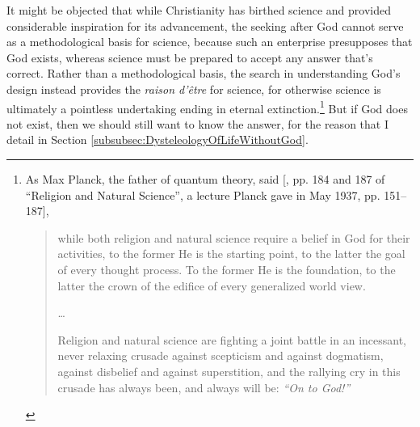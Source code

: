 \documentclass[letterpaper,12pt]{article}
\begin{document}
It might be objected that while Christianity has birthed science and provided considerable inspiration for its advancement, the seeking after God cannot serve as a methodological basis for science, because such an enterprise presupposes that God exists, whereas science must be prepared to accept any answer that's correct. Rather than a methodological basis, the search in understanding God's design instead provides the \emph{raison d'\^{e}tre} for science, for otherwise science is ultimately a pointless undertaking ending in eternal extinction.\footnote{As Max Planck, the father of quantum theory, said [, pp. 184 and 187 of ``Religion and Natural Science'', a lecture Planck gave in May 1937, pp. 151--187], \begin{quotation}
while both religion and natural science require a belief in God for their activities, to the former He is the starting point, to the latter the goal of every thought process. To the former He is the foundation, to the latter the crown of the edifice of every generalized world view.

\ldots

Religion and natural science are fighting a joint battle in an incessant, never relaxing crusade against scepticism and against dogmatism, against disbelief and against superstition, and the rallying cry in this crusade has always been, and always will be: \emph{``On to God!''}
\end{quotation}} But if God does not exist, then we should still want to know the answer, for the reason that I detail in Section \ref{subsubsec:DysteleologyOfLifeWithoutGod}.
\end{document}
